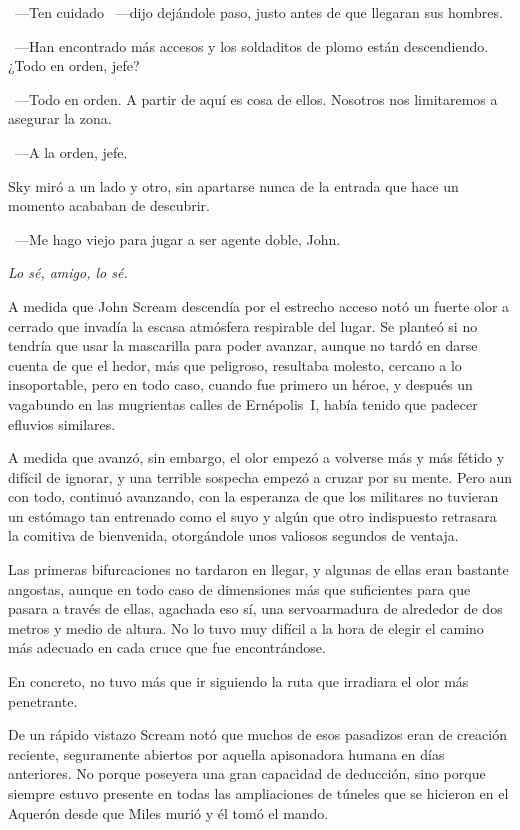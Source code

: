 ~---Ten cuidado ~---dijo dejándole paso, justo antes de que llegaran sus hombres.

~---Han encontrado más accesos y los soldaditos de plomo están descendiendo. ¿Todo en orden, jefe?

~---Todo en orden. A partir de aquí es cosa de ellos. Nosotros nos limitaremos a asegurar la zona.

~---A la orden, jefe.

Sky miró a un lado y otro, sin apartarse nunca de la entrada que hace un momento acababan de descubrir.

~---Me hago viejo para jugar a ser agente doble, John.

\emph{Lo sé, amigo, lo sé.}

\parbreak
A medida que John Scream descendía por el estrecho acceso notó un fuerte olor a cerrado que invadía la escasa atmósfera respirable del lugar. Se planteó si no tendría que usar la mascarilla para poder avanzar, aunque no tardó en darse cuenta de que el hedor, más que peligroso, resultaba molesto, cercano a lo insoportable, pero en todo caso, cuando fue primero un héroe, y después un vagabundo en las mugrientas calles de Ernépolis~I, había tenido que padecer efluvios similares.

A medida que avanzó, sin embargo, el olor empezó a volverse más y más fétido y difícil de ignorar, y una terrible sospecha empezó a cruzar por su mente. Pero aun con todo, continuó avanzando, con la esperanza de que los militares no tuvieran un estómago tan entrenado como el suyo y algún que otro indispuesto retrasara la comitiva de bienvenida, otorgándole unos valiosos segundos de ventaja.

Las primeras bifurcaciones no tardaron en llegar, y algunas de ellas eran bastante angostas, aunque en todo caso de dimensiones más que suficientes para que pasara a través de ellas, agachada eso sí, una servoarmadura de alrededor de dos metros y medio de altura. No lo tuvo muy difícil a la hora de elegir el camino más adecuado en cada cruce que fue encontrándose.

En concreto, no tuvo más que ir siguiendo la ruta que irradiara el olor más penetrante.

De un rápido vistazo Scream notó que muchos de esos pasadizos eran de creación reciente, seguramente abiertos por aquella apisonadora humana en días anteriores. No porque poseyera una gran capacidad de deducción, sino porque siempre estuvo presente en todas las ampliaciones de túneles que se hicieron en el Aquerón desde que Miles murió y él tomó el mando.

